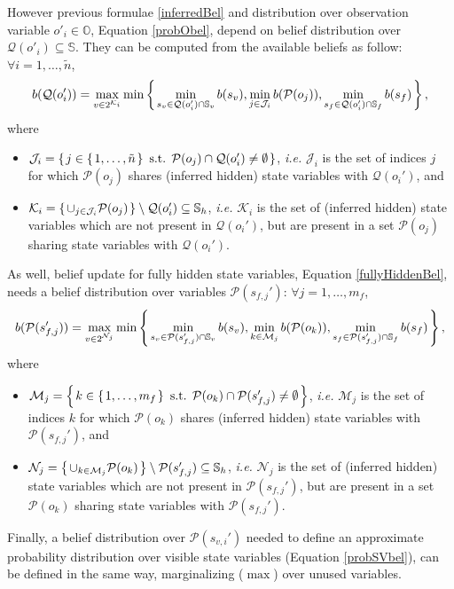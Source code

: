 However previous formulae \ref{inferredBel} 
and distribution over observation variable $o'_i \in \mathbb{O}$, Equation \ref{probObel}, 
depend on belief distribution
over $\mathcal{Q}(o'_i) \subseteq \mathbb{S}$.
They can be computed from the available beliefs as follow: $\forall i=1,\ldots,\tilde{n}$,
\begin{eqnarray}
\label{bq}
b(\mathcal{Q}(o_i')) = \max_{v \in 2^{\mathcal{K}_i}}  \min \left\{ \left.  \min_{s_{v} \in \mathcal{Q}(o_i') \cap \mathbb{S}_v} b(s_{v}), \min_{j \in \mathcal{J}_i }  b(\mathcal{P}(o_j)), \min_{s_{f} \in \mathcal{Q}(o_i') \cap \mathbb{S}_f} b(s_{f})  \right. \right\},
\end{eqnarray}
where
\begin{itemize}
\item $\mathcal{J}_i = \left\{ \left.  j \in \left\{ \left. 1,\ldots,\tilde{n} \right. \right\} \mbox{ s.t. } \mathcal{P}(o_j) \cap \mathcal{Q}(o_i') \neq \emptyset \right. \right\}$, \textit{i.e.} $\mathcal{J}_i$ is the set of indices $j$ 
for which $\mathcal{P}(o_j)$ shares (inferred hidden) state variables with $\mathcal{Q}(o_i')$,
and
\item $\mathcal{K}_i = \left\{ \left. \cup_{j \in \mathcal{J}_i} \mathcal{P}(o_j) \right. \right\} \setminus \mathcal{Q}(o_i') \subseteq \mathbb{S}_h$, \textit{i.e.} $\mathcal{K}_i$ 
is the set of (inferred hidden) state variables which are not present in 
$\mathcal{Q}(o_i')$, but are present in a set $\mathcal{P}(o_j)$ 
sharing state variables with $\mathcal{Q}(o_i')$. 
\end{itemize}
As well, belief update for fully hidden state variables, Equation \ref{fullyHiddenBel}, 
needs a belief distribution over variables $\mathcal{P}(s_{f,j}')$:
$\forall j=1,\ldots,m_f$, 
\begin{eqnarray} 
\label{bp}
b(\mathcal{P}(s_{f,j}')) =  \max_{v \in 2^{\mathcal{N}_j}}  \min \left\{ \left.  \min_{s_{v} \in \mathcal{P}(s_{f,j}') \cap \mathbb{S}_v} b(s_{v}),
\nonumber\min_{k \in \mathcal{M}_j }  b(\mathcal{P}(o_k)), \min_{s_{f} \in \mathcal{P}(s_{f,j}') \cap \mathbb{S}_f} b(s_{f})  \right. \right\},
\end{eqnarray}
where
\begin{itemize}
\item $\mathcal{M}_j= \left\{ \left.  k \in \left\{ \left. 1,\ldots,m_f \right. \right\} \mbox{ s.t. } 
\mathcal{P}(o_k) \cap \mathcal{P}(s_{f,j}') \neq \emptyset \right. \right\}$, \textit{i.e.} $\mathcal{M}_j$ 
is the set of indices $k$ for which $\mathcal{P}(o_k)$ shares (inferred hidden) state variables with $\mathcal{P}(s_{f,j}')$, and
\item $\mathcal{N}_j = \left\{ \left. \cup_{k \in \mathcal{M}_j} \mathcal{P}(o_k) \right. \right\} 
\setminus \mathcal{P}(s_{f,j}') \subseteq \mathbb{S}_h$, \textit{i.e.} $\mathcal{N}_j$ 
is the set of (inferred hidden) state variables which are not present in 
$\mathcal{P}(s_{f,j}')$, but are present in a set $\mathcal{P}(o_k)$ 
sharing state variables with $\mathcal{P}(s_{f,j}')$. 
\end{itemize}
Finally, a belief distribution over $\mathcal{P}(s_{v,i}')$ needed to define an
approximate probability distribution over visible state variables (Equation \ref{probSVbel}),
can be defined in the same way, marginalizing ($\max$) over unused variables.

